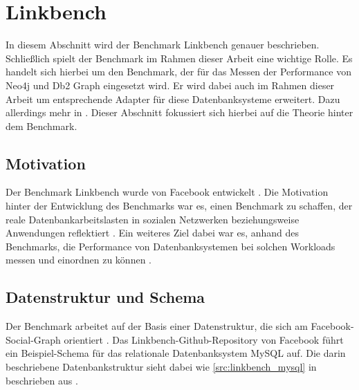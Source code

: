 \section{Linkbench}
\label{linkbench}
In diesem Abschnitt wird der Benchmark Linkbench genauer beschrieben. Schließlich spielt der Benchmark im Rahmen dieser Arbeit eine wichtige Rolle. Es handelt sich hierbei um den Benchmark, der für das Messen der Performance von Neo4j und Db2 Graph eingesetzt wird. Er wird dabei auch im Rahmen dieser Arbeit um entsprechende Adapter für diese Datenbanksysteme erweitert. Dazu allerdings mehr in . Dieser Abschnitt fokussiert sich hierbei auf die Theorie hinter dem Benchmark. 

\subsection{Motivation}
Der Benchmark Linkbench wurde von Facebook entwickelt \cite{linkbench_paper}. Die Motivation hinter der Entwicklung des Benchmarks war es, einen Benchmark zu schaffen, der reale Datenbankarbeitslasten in sozialen Netzwerken beziehungsweise Anwendungen reflektiert \cite{linkbench_paper}. Ein weiteres Ziel dabei war es, anhand des Benchmarks, die Performance von Datenbanksystemen bei solchen Workloads messen und einordnen zu können \cite{linkbench_paper}.

\subsection{Datenstruktur und Schema}
Der Benchmark arbeitet auf der Basis einer Datenstruktur, die sich am Facebook-Social-Graph orientiert \cite{linkbench_paper}. Das Linkbench-Github-Repository \cite{fb_linkbench_github} von Facebook führt ein Beispiel-Schema für das relationale Datenbanksystem MySQL auf. Die darin beschriebene Datenbankstruktur sieht dabei wie \autoref{src:linkbench_mysql} in beschrieben aus \cite{fb_linkbench_github}. 

